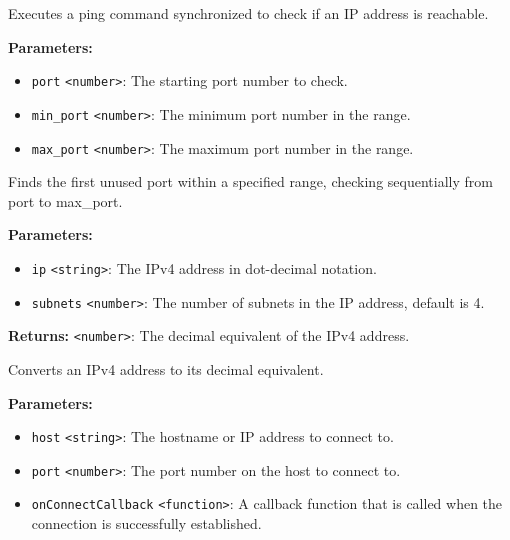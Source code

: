 \documentclass[12pt,a4paper]{article}
\begin{document}
\noindent Executes a ping command synchronized to check if an IP address is reachable.

\vspace{5mm}
\noindent {}


\noindent \textbf{Parameters:}
\begin{itemize}
  \item \texttt{port} \texttt{<number>}: The starting port number to check.
  \item \texttt{min\_port} \texttt{<number>}: The minimum port number in the range.
  \item \texttt{max\_port} \texttt{<number>}: The maximum port number in the range.
\end{itemize}

\noindent Finds the first unused port within a specified range, checking sequentially from \textasciigrave{}port\textasciigrave{} to \textasciigrave{}max\_port\textasciigrave{}.

\vspace{5mm}
\noindent {}


\noindent \textbf{Parameters:}
\begin{itemize}
  \item \texttt{ip} \texttt{<string>}: The IPv4 address in dot-decimal notation.
  \item \texttt{subnets} \texttt{<number>}: The number of subnets in the IP address, default is 4.
\end{itemize}

\noindent \textbf{Returns:} \texttt{<number>}: The decimal equivalent of the IPv4 address.

\noindent Converts an IPv4 address to its decimal equivalent.

\vspace{5mm}
\noindent {}


\noindent \textbf{Parameters:}
\begin{itemize}
  \item \texttt{host} \texttt{<string>}: The hostname or IP address to connect to.
  \item \texttt{port} \texttt{<number>}: The port number on the host to connect to.
  \item \texttt{onConnectCallback} \texttt{<function>}: A callback function that is called when the connection is successfully established.
\end{itemize}
\end{document}
